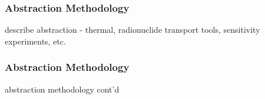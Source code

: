 

\begin{frame}[ctb!]
  \frametitle{Abstraction Methodology}
\footnotesize{
describe abstraction - thermal, radionuclide transport tools, sensitivity experiments, etc.

}
\end{frame}

\begin{frame}[ctb!]
  \frametitle{Abstraction Methodology}
\footnotesize{
abstraction methodology cont'd
}
\end{frame}
